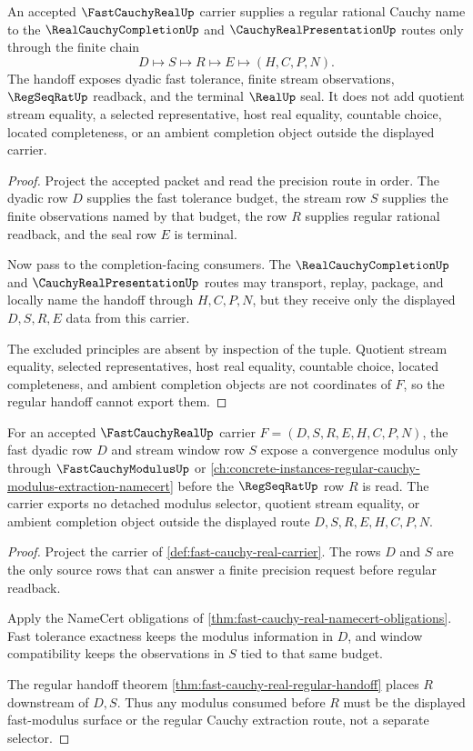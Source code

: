 \begin{theorem}
\label{thm:fast-cauchy-real-regular-handoff}
An accepted $\FastCauchyRealUp$ carrier supplies a regular rational Cauchy name to the $\RealCauchyCompletionUp$ and $\CauchyRealPresentationUp$ routes only through the finite chain
$$
D\longmapsto S\longmapsto R\longmapsto E\longmapsto(H,C,P,N).
$$
The handoff exposes dyadic fast tolerance, finite stream observations, $\RegSeqRatUp$ readback, and the terminal $\RealUp$ seal. It does not add quotient stream equality, a selected representative, host real equality, countable choice, located completeness, or an ambient completion object outside the displayed carrier.
\end{theorem}
\begin{proof}
Project the accepted packet and read the precision route in order. The dyadic row $D$ supplies the fast tolerance budget, the stream row $S$ supplies the finite observations named by that budget, the row $R$ supplies regular rational readback, and the seal row $E$ is terminal.

Now pass to the completion-facing consumers. The $\RealCauchyCompletionUp$ and $\CauchyRealPresentationUp$ routes may transport, replay, package, and locally name the handoff through $H,C,P,N$, but they receive only the displayed $D,S,R,E$ data from this carrier.

The excluded principles are absent by inspection of the tuple. Quotient stream equality, selected representatives, host real equality, countable choice, located completeness, and ambient completion objects are not coordinates of $F$, so the regular handoff cannot export them.
\end{proof}

\begin{theorem}
\label{thm:fast-cauchy-real-modulus-extraction-route}
For an accepted $\FastCauchyRealUp$ carrier $F=(D,S,R,E,H,C,P,N)$, the fast dyadic row $D$ and stream window row $S$ expose a convergence modulus only through $\FastCauchyModulusUp$ or \autoref{ch:concrete-instances-regular-cauchy-modulus-extraction-namecert} before the $\RegSeqRatUp$ row $R$ is read. The carrier exports no detached modulus selector, quotient stream equality, or ambient completion object outside the displayed route $D,S,R,E,H,C,P,N$.
\end{theorem}
\begin{proof}
Project the carrier of \autoref{def:fast-cauchy-real-carrier}. The rows $D$ and $S$ are the only source rows that can answer a finite precision request before regular readback.

Apply the NameCert obligations of \autoref{thm:fast-cauchy-real-namecert-obligations}. Fast tolerance exactness keeps the modulus information in $D$, and window compatibility keeps the observations in $S$ tied to that same budget.

The regular handoff theorem \autoref{thm:fast-cauchy-real-regular-handoff} places $R$ downstream of $D,S$. Thus any modulus consumed before $R$ must be the displayed fast-modulus surface or the regular Cauchy extraction route, not a separate selector.
\end{proof}

